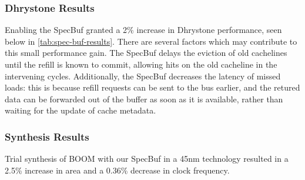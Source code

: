 \subsubsection{Dhrystone Results}
Enabling the SpecBuf granted a 2\% increase in Dhrystone performance, seen below in \ref{tab:spec-buf-results}. There are several factors which may contribute to this small performance gain. The SpecBuf delays the eviction of old cachelines until the refill is known to commit, allowing hits on the old cacheline in the intervening cycles. Additionally, the SpecBuf decreases the latency of missed loads: this is because refill requests can be sent to the bus earlier, and the retured data can be forwarded out of the buffer as soon as it is available, rather than waiting for the update of cache metadata.

\subsubsection{Synthesis Results}
\label{syn}
Trial synthesis of BOOM with our SpecBuf in a 45nm technology resulted in a 2.5\% increase in area and a 0.36\% decrease in clock frequency.
